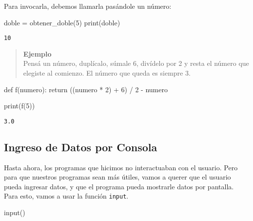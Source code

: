 \documentclass[
  letterpaper,
  DIV=11,
  numbers=noendperiod]{scrreprt}
\newenvironment{Shaded}{\begin{snugshade}}{\end{snugshade}}
\newcommand{\BuiltInTok}[1]{\textcolor[rgb]{0.00,0.23,0.31}{#1}}
\newcommand{\ControlFlowTok}[1]{\textcolor[rgb]{0.00,0.23,0.31}{#1}}
\newcommand{\DecValTok}[1]{\textcolor[rgb]{0.68,0.00,0.00}{#1}}
\newcommand{\KeywordTok}[1]{\textcolor[rgb]{0.00,0.23,0.31}{#1}}
\newcommand{\NormalTok}[1]{\textcolor[rgb]{0.00,0.23,0.31}{#1}}
\newcommand{\OperatorTok}[1]{\textcolor[rgb]{0.37,0.37,0.37}{#1}}
\begin{document}
Para invocarla, debemos llamarla pasándole un número:

\begin{Shaded}
\begin{Highlighting}[]
\NormalTok{doble }\OperatorTok{=}\NormalTok{ obtener\_doble(}\DecValTok{5}\NormalTok{)}
\BuiltInTok{print}\NormalTok{(doble)}
\end{Highlighting}
\end{Shaded}

\begin{verbatim}
10
\end{verbatim}

\begin{quote}
\textbf{Ejemplo}\\
Pensá un número, duplícalo, súmale 6, divídelo por 2 y resta el número
que elegiste al comienzo. El número que queda es siempre 3.
\end{quote}

\begin{Shaded}
\begin{Highlighting}[]
\KeywordTok{def}\NormalTok{ f(numero):}
  \ControlFlowTok{return}\NormalTok{ ((numero }\OperatorTok{*} \DecValTok{2}\NormalTok{) }\OperatorTok{+} \DecValTok{6}\NormalTok{) }\OperatorTok{/} \DecValTok{2} \OperatorTok{{-}}\NormalTok{ numero}
\end{Highlighting}
\end{Shaded}

\begin{Shaded}
\begin{Highlighting}[]
\BuiltInTok{print}\NormalTok{(f(}\DecValTok{5}\NormalTok{))}
\end{Highlighting}
\end{Shaded}

\begin{verbatim}
3.0
\end{verbatim}

\subsection{Ingreso de Datos por
Consola}\label{ingreso-de-datos-por-consola}

Hasta ahora, los programas que hicimos no interactuaban con el usuario.
Pero para que nuestros programas sean más útiles, vamos a querer que el
usuario pueda ingresar datos, y que el programa pueda mostrarle datos
por pantalla. Para esto, vamos a usar la función \texttt{input}.

\begin{Shaded}
\begin{Highlighting}[]
\BuiltInTok{input}\NormalTok{()}
\end{Highlighting}
\end{Shaded}
\end{document}
